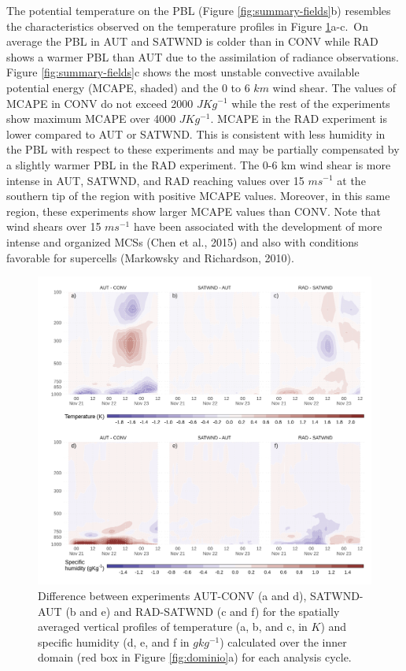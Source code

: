 \documentclass[final,5p,times,twocolumn,authoryear]{elsarticle} %
\begin{document}
The potential temperature on the PBL (Figure \ref{fig:summary-fields}b) resembles the characteristics observed on the temperature profiles in Figure \ref{fig:TQ-diff}a-c.~On average the PBL in AUT and SATWND is colder than in CONV while RAD shows a warmer PBL than AUT due to the assimilation of radiance observations. Figure \ref{fig:summary-fields}c shows the most unstable convective available potential energy (MCAPE, shaded) and the 0 to 6 \(km\) wind shear. The values of MCAPE in CONV do not exceed 2000 \(JKg^{-1}\) while the rest of the experiments show maximum MCAPE over 4000 \(JKg^{-1}\). MCAPE in the RAD experiment is lower compared to AUT or SATWND. This is consistent with less humidity in the PBL with respect to these experiments and may be partially compensated by a slightly warmer PBL in the RAD experiment. The 0-6 km wind shear is more intense in AUT, SATWND, and RAD reaching values over 15 \(ms^{-1}\) at the southern tip of the region with positive MCAPE values. Moreover, in this same region, these experiments show larger MCAPE values than CONV. Note that wind shears over 15 \(ms^{-1}\) have been associated with the development of more intense and organized MCSs (Chen et al., 2015) and also with conditions favorable for supercells (Markowsky and Richardson, 2010).



\begin{figure}[th]

{\centering \includegraphics{../figures/TQ-diff-1} 

}

\caption{Difference between experiments AUT-CONV (a and d), SATWND-AUT (b and e) and RAD-SATWND (c and f) for the spatially averaged vertical profiles of temperature (a, b, and c, in \(K\)) and specific humidity (d, e, and f in \(gkg^{-1}\)) calculated over the inner domain (red box in Figure \ref{fig:dominio}a) for each analysis cycle.}\label{fig:TQ-diff}
\end{figure}
\end{document}
